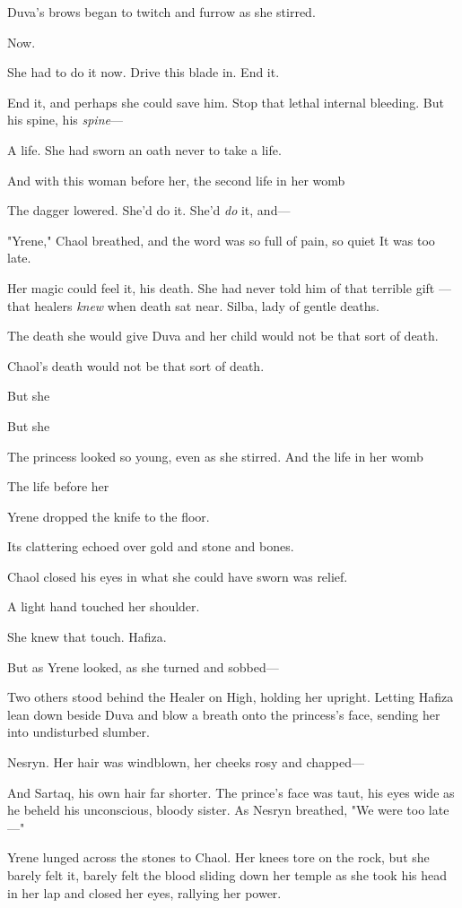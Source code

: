 Duva's brows began to twitch and furrow as she stirred.

Now.

She had to do it now.
Drive this blade in.
End it.

End it, and perhaps she could save him.
Stop that lethal internal bleeding.
But his spine, his \emph{spine}---

A life.
She had sworn an oath never to take a life.

And with this woman before her, the second life in her womb 

The dagger lowered.
She'd do it.
She'd \emph{do} it, and---

"Yrene," Chaol breathed, and the word was so full of pain, so quiet  It was too late.

Her magic could feel it, his death.
She had never told him of that terrible gift ---that healers \emph{knew} when death sat near.
Silba, lady of gentle deaths.

The death she would give Duva and her child would not be that sort of death.

Chaol's death would not be that sort of death.

But she 

But she 

The princess looked so young, even as she stirred.
And the life in her womb 

The life before her 

Yrene dropped the knife to the floor.

Its clattering echoed over gold and stone and bones.

Chaol closed his eyes in what she could have sworn was relief.

A light hand touched her shoulder.

She knew that touch.
Hafiza.

But as Yrene looked, as she turned and sobbed---

Two others stood behind the Healer on High, holding her upright.
Letting Hafiza lean down beside Duva and blow a breath onto the princess's face, sending her into undisturbed slumber.

Nesryn.
Her hair was windblown, her cheeks rosy and chapped---

And Sartaq, his own hair far shorter.
The prince's face was taut, his eyes wide as he beheld his unconscious, bloody sister.
As Nesryn breathed, "We were too late---"

Yrene lunged across the stones to Chaol.
Her knees tore on the rock, but she barely felt it, barely felt the blood sliding down her temple as she took his head in her lap and closed her eyes, rallying her power.

